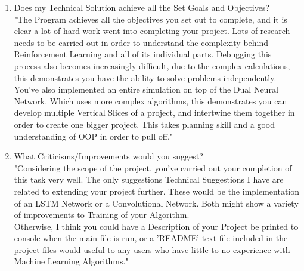 \begin{flushleft}
\begin{enumerate}
            \item Does my Technical Solution achieve all the Set Goals and Objectives? \\
                \vspace{0.2cm}
                "The Program achieves all the objectives you set out to complete, and it is clear a lot of hard work went into completing your
                project. Lots of research needs to be carried out in order to understand the complexity behind Reinforcement Learning and all
                of its individual parts. Debugging this process also becomes increasingly difficult, due to the complex calculations, this 
                demonstrates you have the ability to solve problems independently. \\
                \vspace{0.2cm}
                You've also implemented an entire simulation on top of the Dual Neural Network. Which uses more complex algorithms, this demonstrates
                you can develop multiple Vertical Slices of a project, and intertwine them together in order to create one bigger project. This
                takes planning skill and a good understanding of OOP in order to pull off." \\

            \item What Criticisms/Improvements would you suggest? \\
                \vspace{0.2cm}
                "Considering the scope of the project, you've carried out your completion of this task very well. The only suggestions Technical Suggestions
                I have are related to extending your project further. These would be the implementation of an LSTM Network or a Convolutional Network. Both
                might show a variety of improvements to Training of your Algorithm. \\
                \vspace{0.2cm}
                Otherwise, I think you could have a Description of your Project be printed to console when the main file is run, or a 'README' text file 
                included in the project files would useful to any users who have little to no experience with Machine Learning Algorithms." \\
        \end{enumerate}
        \vspace{0.5cm}

\end{flushleft}
